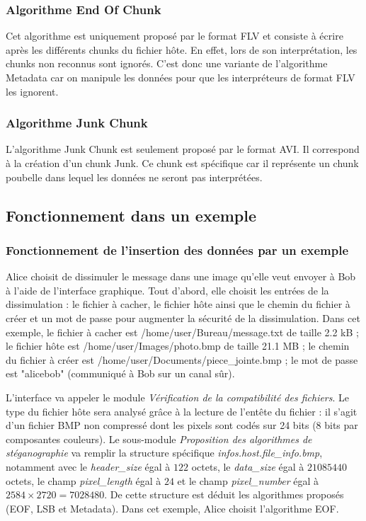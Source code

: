 \documentclass[11pt]{article}
\begin{document}
\subsubsection{Algorithme End Of Chunk}

Cet algorithme est uniquement proposé par le format FLV et consiste à 
écrire après les différents chunks du fichier hôte. En effet, lors de 
son interprétation, les chunks non reconnus sont ignorés. C'est donc une 
variante de l'algorithme Metadata car on manipule les données pour que 
les interpréteurs de format FLV les ignorent. 

\subsubsection{Algorithme Junk Chunk}

L'algorithme Junk Chunk est seulement proposé par le format AVI. Il correspond 
à la création d'un chunk Junk. Ce chunk est spécifique car il représente 
un chunk poubelle dans lequel les données ne seront pas interprétées. 

\subsection{Fonctionnement dans un exemple}

\subsubsection{Fonctionnement de l'insertion des données par un exemple}

Alice choisit de dissimuler le message dans une image qu'elle veut envoyer 
à Bob à l'aide de l'interface graphique. 
Tout d'abord, elle choisit les entrées de la dissimulation : le fichier 
à cacher, le fichier hôte ainsi que le chemin du fichier à créer et un mot 
de passe pour augmenter la sécurité de la dissimulation. 
Dans cet exemple, le fichier à cacher est /home/user/Bureau/message.txt 
de taille 2.2 kB ; le fichier hôte est /home/user/Images/photo.bmp 
de taille 21.1 MB ; le chemin du fichier à créer est 
/home/user/Documents/piece\_jointe.bmp ; le mot de passe est "alicebob" 
(communiqué à Bob sur un canal sûr). 

L'interface va appeler le module \textit{Vérification de la compatibilité 
des fichiers}. Le type du fichier hôte sera analysé grâce à la lecture 
de l'entête du fichier : il s'agit d'un fichier BMP non compressé dont les 
pixels sont codés sur 24 bits (8 bits par composantes couleurs). 
Le sous-module \textit{Proposition des algorithmes de stéganographie} va 
remplir la structure spécifique 
\textit{infos.host.file\_info.bmp}, notamment avec le 
\textit{header\_size} égal à $122$ octets, le \textit{data\_size} égal à 
$21085440$ octets, le champ \textit{pixel\_length} égal à $24$ et le champ 
\textit{pixel\_number} égal à $2584 \times 2720 = 7028480$. De cette structure
est déduit les algorithmes proposés (EOF, LSB et Metadata). 
Dans cet exemple, Alice choisit l'algorithme EOF. 
\end{document}
